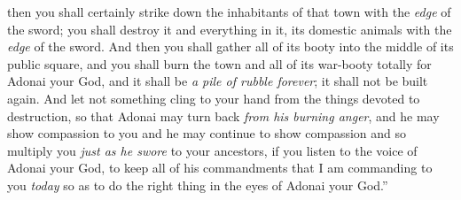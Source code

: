 \begin{biblechapter}
\verse then you shall certainly strike down the inhabitants of that town with the \textit{edge} of the sword; you shall destroy it and everything in it, its domestic animals with the \textit{edge} of the sword.
\verse And then you shall gather all of its booty into the middle of its public square, and you shall burn the town and all of its war-booty totally for Adonai your God, and it shall be \textit{a pile of rubble forever}; it shall not be built again.
\verse And let not something cling to your hand from the things devoted to destruction, so that Adonai may turn back \textit{from his burning anger}, and he may show compassion to you and he may continue to show compassion and so multiply you \textit{just as he swore} to your ancestors,
\verse if you listen to the voice of Adonai your God, to keep all of his commandments that I am commanding to you \textit{today} so as to do the right thing in the eyes of Adonai your God.”
\end{biblechapter}

